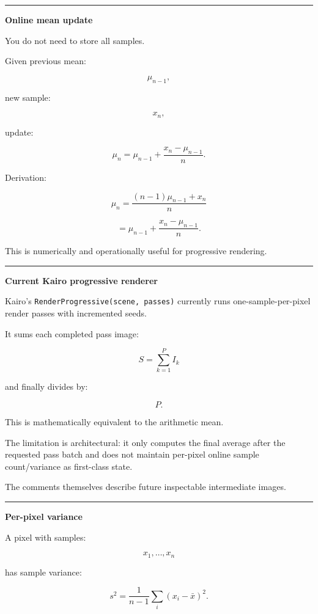 \begin{center}\rule{0.5\linewidth}{0.5pt}\end{center}

\textbf{Online mean update}

You do not need to store all samples.

Given previous mean:

\[
\mu_{n-1},
\]

new sample:

\[
x_n,
\]

update:

\[
\boxed{
\mu_n
=
\mu_{n-1}
+
\frac{
x_n-\mu_{n-1}
}{
n
}.
}
\]

Derivation:

\[
\mu_n
=
\frac{
(n-1)\mu_{n-1}+x_n
}{
n
}
\]

\[
=
\mu_{n-1}
+
\frac{x_n-\mu_{n-1}}{n}.
\]

This is numerically and operationally useful for progressive rendering.

\begin{center}\rule{0.5\linewidth}{0.5pt}\end{center}

\textbf{Current Kairo progressive renderer}

Kairo's \texttt{RenderProgressive(scene,\ passes)} currently runs one-sample-per-pixel render passes with incremented seeds.

It sums each completed pass image:

\[
S=
\sum_{k=1}^{P}I_k
\]

and finally divides by:

\[
P.
\]

This is mathematically equivalent to the arithmetic mean.

The limitation is architectural: it only computes the final average after the requested pass batch and does not maintain per-pixel online sample count/variance as first-class state.

The comments themselves describe future inspectable intermediate images.

\begin{center}\rule{0.5\linewidth}{0.5pt}\end{center}

\textbf{Per-pixel variance}

A pixel with samples:

\[
x_1,\dots,x_n
\]

has sample variance:

\[
\boxed{
s^2
=
\frac{
1
}{
n-1
}
\sum_i
(x_i-\bar x)^2.
}
\]


